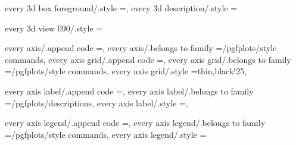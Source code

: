 every 3d box foreground/.style                                     ={},                                                                                                                                
every 3d description/.style                                        ={                                                                                                                                 
every 3d view {0}{90}/.style                                       ={                                                                                                                                 
every axis/.append code                                            ={},                                                                                 
every axis/.belongs to family                                      =/pgfplots/style commands,                                                                                                          
every axis grid/.append code                                       ={},                                                                            
every axis grid/.belongs to family                                 =/pgfplots/style commands,                                                                                                          
every axis grid/.style                                             ={thin,black!25},                                                                                                                   

every axis label/.append code                                      ={},                                                                           
every axis label/.belongs to family                                =/pgfplots/descriptions,                                                                                                            
every axis label/.style                                            ={},                                                                                                                                

every axis legend/.append code                                     ={},                                                                          
every axis legend/.belongs to family                               =/pgfplots/style commands,                                                                                                          
every axis legend/.style                                           ={                                                                                                                                 

}}}
